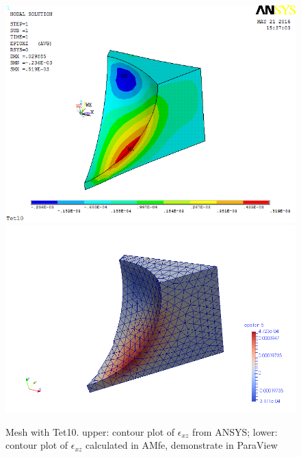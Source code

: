 \begin{figure}[htbp]
	\begin{center}
		\includegraphics[width=13cm,clip]{Tet10_Exz.png} 		
		\includegraphics[width=13cm,clip]{Tet10_Exz_P.png} 		
		\caption{Mesh with Tet10. upper: contour plot of $\epsilon_{xz}$ from ANSYS; lower: contour plot of $\epsilon_{xz}$ calculated in AMfe, demonstrate in ParaView} \label{fig: Tet10_Exz}
	\end{center}
\end{figure}
\clearpage 

